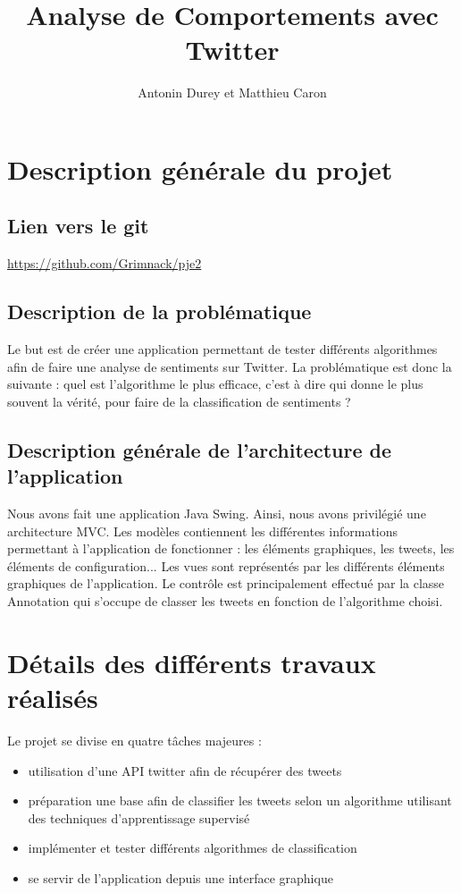\documentclass[a4paper,10pt]{report}
\title{Analyse de Comportements avec Twitter}
\author{Antonin Durey et Matthieu Caron}
\begin{document}
\maketitle
\clearpage
{}
\chapter{Description générale du projet}
  \section{Lien vers le git}
    \url{https://github.com/Grimnack/pje2}
  \section{Description de la problématique}
    Le but est de créer une application permettant de tester différents algorithmes
    afin de faire une analyse de sentiments sur Twitter. La problématique est donc la suivante :
    quel est l'algorithme le plus efficace, c'est à dire qui donne le plus souvent la vérité, pour faire de la 
    classification de sentiments ?
  \section{Description générale de l'architecture de l'application}
    Nous avons fait une application Java Swing. Ainsi, nous avons privilégié une architecture MVC.
    Les modèles contiennent les différentes informations permettant à l'application de fonctionner : les éléments graphiques, les tweets, les éléments de configuration...
    Les vues sont représentés par les différents éléments graphiques de l'application.
    Le contrôle est principalement effectué par la classe Annotation qui s'occupe de classer les tweets en fonction de l'algorithme choisi. 
\chapter{Détails des différents travaux réalisés}
  Le projet se divise en quatre tâches majeures : 
  \begin{itemize}
   \item utilisation d'une API twitter afin de récupérer des tweets
   \item préparation une base afin de classifier les tweets selon un algorithme utilisant des techniques d'apprentissage supervisé
   \item implémenter et tester différents algorithmes de classification
   \item se servir de l'application depuis une interface graphique
  \end{itemize}
\end{document}

